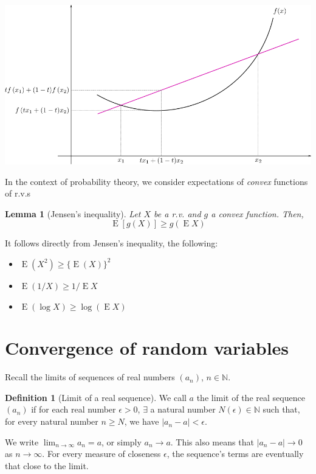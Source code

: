 \documentclass[
]{book}
\providecommand{\tightlist}{%
  \setlength{\itemsep}{0pt}\setlength{\parskip}{0pt}}
\DeclareMathOperator{\E}{E}
\newcommand{\bbN}{\mathbb{N}}
\newtheorem{lemma}{Lemma}[chapter]
\theoremstyle{definition}
\newtheorem{definition}{Definition}[chapter]
\theoremstyle{definition}
\theoremstyle{definition}
\theoremstyle{definition}
\theoremstyle{remark}
\begin{document}
\begin{center}\includegraphics[width=0.8\linewidth]{figure/01-jensen} \end{center}

In the context of probability theory, we consider expectations of \emph{convex} functions of r.v.s

\begin{lemma}[Jensen's inequality]
Let \(X\) be a r.v. and \(g\) a convex function. Then, \[\E\left[g(X) \right] \geq g\left(\E X \right)\]
\end{lemma}

It follows directly from Jensen's inequality, the following:

\begin{itemize}
\tightlist
\item
  \(\E(X^2) \geq \{\E(X)\}^2\)
\item
  \(\E(1/X) \geq 1 / \E X\)
\item
  \(\E(\log X) \geq \log (\E X)\)
\end{itemize}

\hypertarget{convergence-of-random-variables}{%
\section{Convergence of random variables}\label{convergence-of-random-variables}}

Recall the limits of sequences of real numbers \((a_n)\), \(n\in\bbN\).

\begin{definition}[Limit of a real sequence]
We call \(a\) the limit of the real sequence \((a_n)\) if for each real
number \(\epsilon>0\), \(\exists\) a natural number \(N(\epsilon)\in\bbN\) such that, for
every natural number \(n\geq N\), we have \(|a_n-a| < \epsilon\).
\end{definition}

We write \(\lim_{n\to\infty} a_n = a\), or simply \(a_n \to a\). This also
means that \(|a_n-a| \to 0\) as \(n\to\infty\). For every measure of
closeness \(\epsilon\), the sequence's terms are eventually that close to
the limit.
\end{document}
